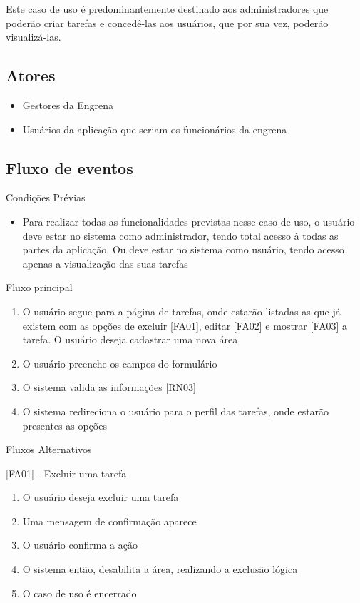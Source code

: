 Este caso de uso é predominantemente destinado aos administradores que poderão criar tarefas e concedê-las aos usuários, que por sua vez, poderão visualizá-las.


\subsection{Atores}

\begin{itemize}
  \item{Gestores da Engrena}
  \item{Usuários da aplicação que seriam os funcionários da engrena}
\end{itemize}

\subsection{Fluxo de eventos}

Condições Prévias
\begin{itemize}
  \item{Para realizar todas as funcionalidades previstas nesse caso de uso, o usuário deve estar no sistema como administrador, tendo total acesso à todas as partes da aplicação. Ou deve estar no sistema como usuário, tendo acesso apenas a visualização das suas tarefas}
\end{itemize}



Fluxo principal

\begin{enumerate}
  \item{O usuário segue para a página de tarefas, onde estarão listadas as que já existem com as opções de excluir [FA01], editar [FA02] e mostrar [FA03] a tarefa. O usuário deseja cadastrar uma nova área}
  \item{O usuário preenche os campos do formulário}
  \item{O sistema valida as informações [RN03]}
  \item{O sistema redireciona o usuário para o perfil das tarefas, onde estarão presentes as opções}
\end{enumerate}


Fluxos Alternativos

[FA01] - Excluir uma tarefa
\begin{enumerate}
  \item{O usuário deseja excluir uma tarefa}
  \item{Uma mensagem de confirmação aparece}
  \item{O usuário confirma a ação}
  \item{O sistema então, desabilita a área, realizando a exclusão lógica}
  \item{O caso de uso é encerrado}
\end{enumerate}


